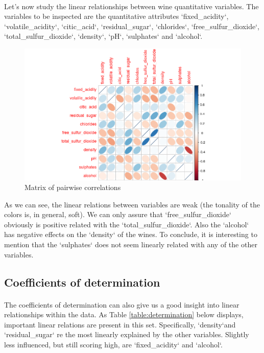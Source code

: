 \documentclass[10pt]{article}
\begin{document}
\paragraph*{}
Let's now study the linear relationships between wine quantitative variables. The variables to be inspected are the quantitative attributes `fixed\_acidity`, `volatile\_acidity`, `citic\_acid`, `residual\_sugar`, `chlorides`, `free\_sulfur\_dioxide`, `total\_sulfur\_dioxide`, `density`, `pH`, `sulphates` and `alcohol`. 

\begin{figure}[H]
	\centering
	\includegraphics[width=5.5in]{figures/correlations.png}
	\caption{Matrix of pairwise correlations} 
	\label{figure:correlationsy}
\end{figure}

As we can see, the linear relations between variables are weak (the tonality of the colors is, in general, soft). We can only assure that `free\_sulfur\_dioxide` obviously is positive related with the `total\_sulfur\_dioxide`. Also the `alcohol` has negative effects on the `density` of the wines. To conclude, it is interesting to mention that the `sulphates` does not seem linearly related with any of the other variables. 

\subsection{Coefficients of determination}
\paragraph*{}
The coefficients of determination can also give us a good insight into linear relationships within the data. As Table \ref{table:determination} below displays, important linear relations are present in this set. Specifically, `density`and `residual\_sugar` re the most linearly explained by the other variables. Slightly less influenced, but still scoring high, are `fixed\_acidity` and `alcohol`.
\end{document}
